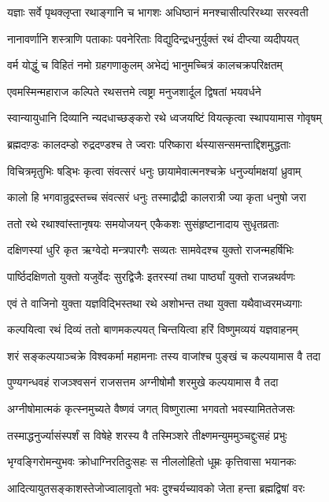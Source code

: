 \twolineshloka
{यज्ञाः सर्वे पृथक्लृप्ता रथाङ्गानि च भागशः}
{अधिष्ठानं मनश्चासीत्परिरथ्या सरस्वती}


\twolineshloka
{नानावर्णानि शस्त्राणि पताकाः पवनेरिताः}
{विद्युदिन्द्रधनुर्युक्तं रथं दीप्त्या व्यदीपयत्}


\twolineshloka
{वर्म योद्धुं च विहितं नमो ग्रहगणाकुलम्}
{अभेद्यं भानुमच्चित्रं कालचक्रपरिक्षतम्}


\twolineshloka
{एवमस्मिन्महाराज कल्पिते रथसत्तमे}
{त्वष्ट्रा मनुजशार्दूल द्विषतां भयवर्धने}


\twolineshloka
{स्वान्यायुधानि दिव्यानि न्यदधाच्छङ्करो रथे}
{ध्वजयष्टिं वियत्कृत्वा स्थापयामास गोवृषम्}


\twolineshloka
{ब्रह्मदण़्डः कालदम्डो रुद्रदण्डश्च ते ज्वराः}
{परिष्कारा र्थस्यासन्समन्ताद्दिशमुद्धताः}


\twolineshloka
{विचित्रमृतुभिः षड्भिः कृत्वा संवत्सरं धनुः}
{छायामेवात्मनश्चक्रे धनुर्ज्यामक्षयां ध्रुवाम्}


\twolineshloka
{कालो हि भगवान्रुद्रस्तच्च संवत्सरं धनुः}
{तस्माद्रौद्री कालरात्री ज्या कृता धनुषो जरा}


\twolineshloka
{ततो रथे रथाश्वांस्तानृषयः समयोजयन्}
{एकैकशः सुसंहृष्टानादाय सुधृतव्रताः}


\twolineshloka
{दक्षिणस्यां धुरि कृत ऋग्वेदो मन्त्रपारगैः}
{सव्यतः सामवेदश्च युक्तो राजन्महर्षिभिः}


\twolineshloka
{पार्ष्ठिदक्षिणतो युक्तो यजुर्वेदः सुरद्विजैः}
{इतरस्यां तथा पार्ष्ठ्यां युक्तो राजन्नथर्वणः}


\twolineshloka
{एवं ते वाजिनो युक्ता यज्ञविद्भिस्तथा रथे}
{अशोभन्त तथा युक्ता यथैवाध्वरमध्यगाः}


\twolineshloka
{कल्पयित्वा रथं दिव्यं ततो बाणमकल्पयत्}
{चिन्तयित्वा हरिं विष्णुमव्ययं यज्ञवाहनम्}


\twolineshloka
{शरं सङ्कल्पयाञ्चक्रे विश्वकर्मा महामनाः}
{तस्य वाजांश्च पुङ्खं च कल्पयामास वै तदा}


\twolineshloka
{पुण्यगन्धवहं राजञ्श्वसनं राजसत्तम}
{अग्नीषोमौ शरमुखे कल्पयामास वै तदा}


\twolineshloka
{अग्नीषोमात्मकं कृत्स्नमुच्यते वैष्णवं जगत्}
{विष्णुरात्मा भगवतो भवस्यामिततेजसः}


\twolineshloka
{तस्माद्धनुर्ज्यासंस्पर्शं स विषेहे शरस्य वै}
{तस्मिञ्शरे तीक्ष्णमन्युममुञ्चद्दुःसहं प्रभुः}


\twolineshloka
{भृग्वङ्गिरोमन्युभवः क्रोधाग्निरतिदुःसहः}
{स नीललोहितो धूम्रः कृत्तिवासा भयानकः}


\twolineshloka
{आदित्यायुतसङ्काशस्तेजोज्वालावृतो भवः}
{दुश्चर्यच्यावको जेता हन्ता ब्रह्मद्विषां वरः}


